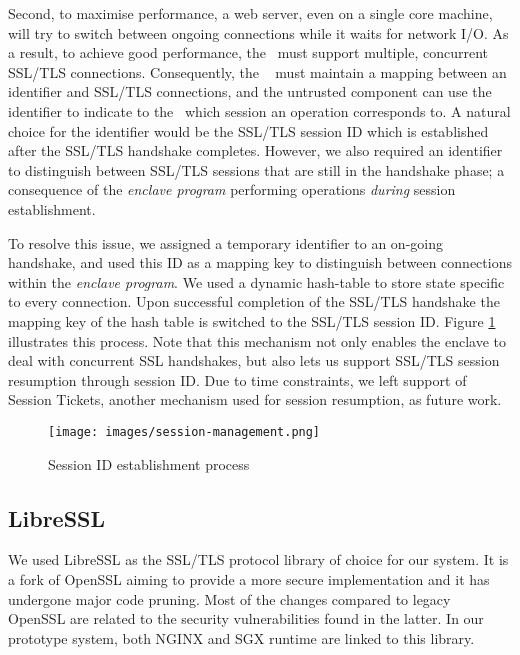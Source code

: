 \documentclass[../main.tex]{subfiles}
\begin{document}
Second, to maximise performance, a web server, even on a single core
machine, will try to switch between ongoing connections while it waits
for network I/O. As a result, to achieve good performance, the
\enclaveprogram~must support multiple, concurrent SSL/TLS connections.
Consequently, the \enclaveprogram~ must maintain a mapping between an
identifier and SSL/TLS connections, and the untrusted component can
use the identifier to indicate to the \enclaveprogram~which session an
operation corresponds to. A natural choice for the identifier would be
the SSL/TLS session ID which is established after the SSL/TLS
handshake completes. However, we also required an identifier to
distinguish between SSL/TLS sessions that are still in the handshake
phase; a consequence of the \textit{enclave program} performing
operations \textit{during} session establishment.

To resolve this issue, we assigned a temporary identifier to an
on-going handshake, and used this ID as a mapping key to distinguish
between connections within the \textit{enclave program}. We used a
dynamic hash-table to store state specific to every connection. Upon
successful completion of the SSL/TLS handshake the mapping key of the
hash table is switched to the SSL/TLS session ID. Figure
\ref{fig:session-management} illustrates this process. Note that this
mechanism not only enables the enclave to deal with concurrent SSL
handshakes, but also lets us support SSL/TLS session resumption
through session ID. Due to time constraints, we left support of
Session Tickets, another mechanism used for session resumption, as
future work.

\begin{figure}[H]
  \centering
  \texttt{[image: images/session-management.png]}
  \caption{Session ID establishment process}
  \label{fig:session-management}
\end{figure}

\subsection{LibreSSL}
\label{subsec:libressl}
We used LibreSSL as the SSL/TLS protocol library of choice for our
system. It is a fork of OpenSSL aiming to provide a more secure
implementation and it has undergone major code pruning. Most of the
changes compared to legacy OpenSSL are related to the security
vulnerabilities found in the latter. In our prototype system, both
NGINX and SGX runtime are linked to this library.
\end{document}
